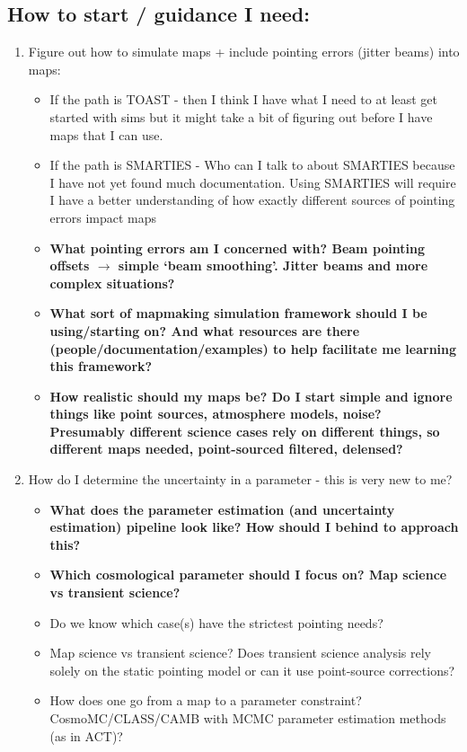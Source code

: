 \subsection{How to start / guidance I need:}
\begin{enumerate}
    \item Figure out how to simulate maps + include pointing errors (jitter beams) into maps: \begin{itemize}
        \item If the path is TOAST - then I think I have what I need to at least get started with sims but it might take a bit of figuring out before I have maps that I can use.  
        \item If the path is SMARTIES - Who can I talk to about SMARTIES because I have not yet found much documentation. Using SMARTIES will require I have a better understanding of how exactly different sources of pointing errors impact maps
        \item {\bf What pointing errors am I concerned with? Beam pointing offsets $\rightarrow$ simple `beam smoothing'. Jitter beams and more complex situations?}
        \item {\bf What sort of mapmaking simulation framework should I be using/starting on? And what resources are there (people/documentation/examples) to help facilitate me learning this framework?}
        \item {\bf How realistic should my maps be? Do I start simple and ignore things like point sources, atmosphere models, noise? Presumably different science cases rely on different things, so different maps needed, point-sourced filtered, delensed?}
    \end{itemize}
    \item How do I determine the uncertainty in a parameter - this is very new to me? \begin{itemize}
        \item {\bf What does the parameter estimation (and uncertainty estimation) pipeline look like? How should I behind to approach this?}
        \item {\bf Which cosmological parameter should I focus on? Map science vs transient science?}
        \item Do we know which case(s) have the strictest pointing needs? 
        \item Map science vs transient science? Does transient science analysis rely solely on the static pointing model or can it use point-source corrections? 
        \item How does one go from a map to a parameter constraint? CosmoMC/CLASS/CAMB with MCMC parameter estimation methods (as in ACT)?

    \end{itemize}
\end{enumerate}

